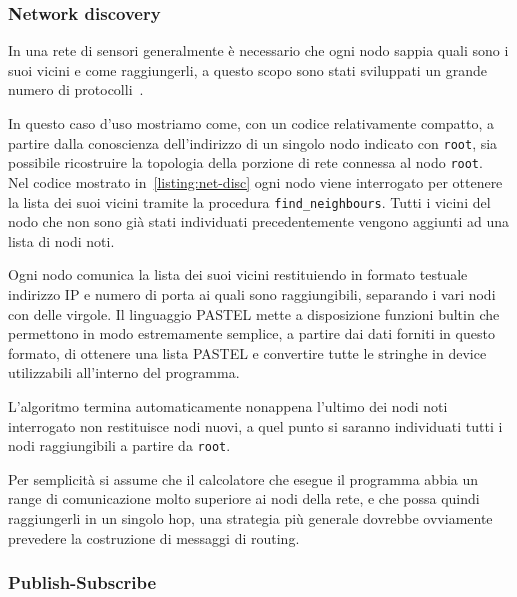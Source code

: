 \documentclass[]{article}
\begin{document}
\subsubsection{Network discovery}\label{subsubsection:net-disc}
In una rete di sensori generalmente è necessario che ogni nodo sappia quali sono i suoi vicini e come raggiungerli, a questo scopo sono stati sviluppati un grande numero di protocolli~\cite{narten1998neighbor, kandhalu2010u, alsa2012secure}.

In questo caso d'uso mostriamo come, con un codice relativamente compatto, a partire dalla conoscienza dell'indirizzo di un singolo nodo indicato con \texttt{root}, sia possibile ricostruire la topologia della porzione di rete connessa al nodo \texttt{root}.\\
Nel codice mostrato in~\ref{listing:net-disc} ogni nodo viene interrogato per ottenere la lista dei suoi vicini tramite la procedura \texttt{find\_neighbours}. Tutti i vicini del nodo che non sono già stati individuati precedentemente vengono aggiunti ad una lista di nodi noti.

Ogni nodo comunica la lista dei suoi vicini restituiendo in formato testuale indirizzo IP e numero di porta ai quali sono raggiungibili, separando i vari nodi con delle virgole. Il linguaggio PASTEL mette a disposizione funzioni bultin che permettono in modo estremamente semplice, a partire dai dati forniti in questo formato, di ottenere una lista PASTEL e convertire tutte le stringhe in device utilizzabili all'interno del programma.

L'algoritmo termina automaticamente nonappena l'ultimo dei nodi noti interrogato non restituisce nodi nuovi, a quel punto si saranno individuati tutti i nodi raggiungibili a partire da \texttt{root}.

Per semplicità si assume che il calcolatore che esegue il programma abbia un range di comunicazione molto superiore ai nodi della rete, e che possa quindi raggiungerli in un singolo hop, una strategia più generale dovrebbe ovviamente prevedere la costruzione di messaggi di routing.



\subsubsection{Publish-Subscribe}\label{subsubsection:pub-sub}
\end{document}
